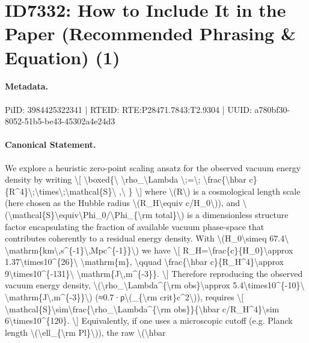 \section*{ID7332: How to Include It in the Paper (Recommended Phrasing \& Equation) (1)}
\paragraph{Metadata.}
PiID: 3984425322341 | RTEID: RTE:P28471.7843:T2.9304 | UUID: a780bf30-8052-51b5-be43-45302a4e24d3

\paragraph{Canonical Statement.}
We explore a heuristic zero-point scaling ansatz for the observed vacuum energy density by writing \textbackslash{}[ \textbackslash{}boxed\{\textbackslash{} \textbackslash{}rho\_\textbackslash{}Lambda \textbackslash{};=\textbackslash{}; \textbackslash{}frac\{\textbackslash{}hbar c\}\{R\textasciicircum{}4\}\textbackslash{};\textbackslash{}times\textbackslash{};\textbackslash{}mathcal\{S\}\textbackslash{} ,\textbackslash{} \} \textbackslash{}] where \textbackslash{}(R\textbackslash{}) is a cosmological length scale (here chosen as the Hubble radius \textbackslash{}(R\_H\textbackslash{}equiv c/H\_0\textbackslash{})), and \textbackslash{}(\textbackslash{}mathcal\{S\}\textbackslash{}equiv\textbackslash{}Phi\_0/\textbackslash{}Phi\_\{\textbackslash{}rm total\}\textbackslash{}) is a dimensionless structure factor encapsulating the fraction of available vacuum phase-space that contributes coherently to a residual energy density. With \textbackslash{}(H\_0\textbackslash{}simeq 67.4\textbackslash{} \textbackslash{}mathrm\{km\textbackslash{},s\textasciicircum{}\{-1\}\textbackslash{},Mpc\textasciicircum{}\{-1\}\}\textbackslash{}) we have \textbackslash{}[ R\_H=\textbackslash{}frac\{c\}\{H\_0\}\textbackslash{}approx 1.37\textbackslash{}times10\textasciicircum{}\{26\}\textbackslash{} \textbackslash{}mathrm\{m\}, \textbackslash{}qquad \textbackslash{}frac\{\textbackslash{}hbar c\}\{R\_H\textasciicircum{}4\}\textbackslash{}approx 9\textbackslash{}times10\textasciicircum{}\{-131\}\textbackslash{} \textbackslash{}mathrm\{J\textbackslash{},m\textasciicircum{}\{-3\}\}. \textbackslash{}] Therefore reproducing the observed vacuum energy density, \textbackslash{}(\textbackslash{}rho\_\textbackslash{}Lambda\textasciicircum{}\{\textbackslash{}rm obs\}\textbackslash{}approx 5.4\textbackslash{}times10\textasciicircum{}\{-10\}\textbackslash{} \textbackslash{}mathrm\{J\textbackslash{},m\textasciicircum{}\{-3\}\}\textbackslash{}) (≈0.7·ρ\textbackslash{}(\_\{\textbackslash{}rm crit\}c\textasciicircum{}2\textbackslash{})), requires \textbackslash{}[ \textbackslash{}mathcal\{S\}\textbackslash{}sim\textbackslash{}frac\{\textbackslash{}rho\_\textbackslash{}Lambda\textasciicircum{}\{\textbackslash{}rm obs\}\}\{\textbackslash{}hbar c/R\_H\textasciicircum{}4\}\textbackslash{}sim 6\textbackslash{}times10\textasciicircum{}\{120\}. \textbackslash{}] Equivalently, if one uses a microscopic cutoff (e.g. Planck length \textbackslash{}(\textbackslash{}ell\_\{\textbackslash{}rm Pl\}\textbackslash{})), the raw \textbackslash{}(\textbackslash{}hbar 